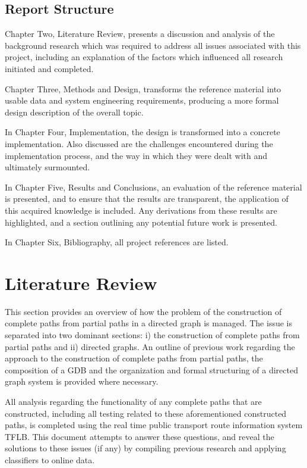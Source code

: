 \documentclass[12pt]{article}   	%
\begin{document}
\newpage

\subsection{Report Structure}
Chapter Two, Literature Review, presents a discussion and analysis of the background research which was required to address all issues associated with this project, including an explanation of the factors which influenced all research initiated and completed.

Chapter Three, Methods and Design, transforms the reference material into usable data and system engineering requirements, producing a more formal design description of the overall topic.

In Chapter Four, Implementation, the design is transformed into a concrete implementation. Also discussed are the challenges encountered during the implementation process, and the way in which they were dealt with and ultimately surmounted.

In Chapter Five, Results and Conclusions, an evaluation of the reference material is presented, and to ensure that the results are transparent, the application of this acquired knowledge is included. Any derivations from these results are highlighted, and a section outlining any potential future work is presented.

In Chapter Six, Bibliography, all project references are listed.

\newpage

\section{Literature Review}
This section provides an overview of how the problem of the construction of complete paths from partial paths in a directed graph is managed. The issue is separated into two dominant sections: i) the construction of complete paths from partial paths and ii) directed graphs. An outline of previous work regarding the approach to the construction of complete paths from partial paths, the composition of a GDB and the organization and formal structuring of a directed graph system is provided where necessary.

All analysis regarding the functionality of any complete paths that are constructed, including all testing related to these aforementioned constructed paths, is completed using the real time public transport route information system TFLB. This document attempts to answer these questions, and reveal the solutions to these issues (if any) by compiling previous research and applying classifiers to online data.
\end{document}
